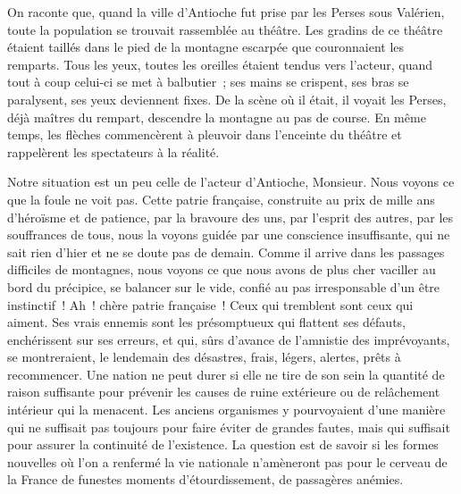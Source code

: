\documentclass[french,twoside]{book} %
\newcommand\orgName[1]{#1}
\newcommand\placeName[1]{#1}
\begin{document}
On raconte que, quand la ville d’{\placeName Antioche} fut prise par les {\orgName Perses} sous {\placeName Valérien}, toute la population se trouvait rassemblée au théâtre. Les gradins de ce théâtre étaient taillés dans le pied de la montagne escarpée que couronnaient les remparts. Tous les yeux, toutes les oreilles étaient tendus vers l’acteur, quand tout à coup celui-ci se met à balbutier ; ses mains se crispent, ses bras se paralysent, ses yeux deviennent fixes. De la scène où il était, il voyait les Perses, déjà maîtres du rempart, descendre la montagne au pas de course. En même temps, les flèches commencèrent à pleuvoir dans l’enceinte du théâtre et rappelèrent les spectateurs à la réalité.\par
Notre situation est un peu celle de l’acteur d’{\placeName Antioche}, Monsieur. Nous voyons ce que la foule ne voit pas. Cette patrie française, construite au prix de mille ans d’héroïsme et de patience, par la bravoure des uns, par l’esprit des autres, par les souffrances de tous, nous la voyons guidée par une conscience insuffisante, qui ne sait rien d’hier et ne se doute pas de demain. Comme il arrive dans les passages difficiles de montagnes, nous voyons ce que nous avons de plus cher vaciller au bord du précipice, se balancer sur le vide, confié au pas irresponsable d’un être instinctif ! Ah ! chère patrie française ! Ceux qui tremblent sont ceux qui aiment. Ses vrais ennemis sont les présomptueux qui flattent ses défauts, enchérissent sur ses erreurs, et qui, sûrs d’avance de l’amnistie des imprévoyants, se montreraient, le lendemain des désastres, frais, légers, alertes, prêts à recommencer. Une nation ne peut durer si elle ne tire de son sein la quantité de raison suffisante pour prévenir les causes de ruine extérieure ou de relâchement intérieur qui la menacent. Les anciens organismes y pourvoyaient d’une manière qui ne suffisait pas toujours pour faire éviter de grandes fautes, mais qui suffisait pour assurer la continuité de l’existence. La question est de savoir si les formes nouvelles où l’on a renfermé la vie nationale n’amèneront pas pour le cerveau de la {\orgName France} de funestes moments d’étourdissement, de passagères anémies.\par
\end{document}
